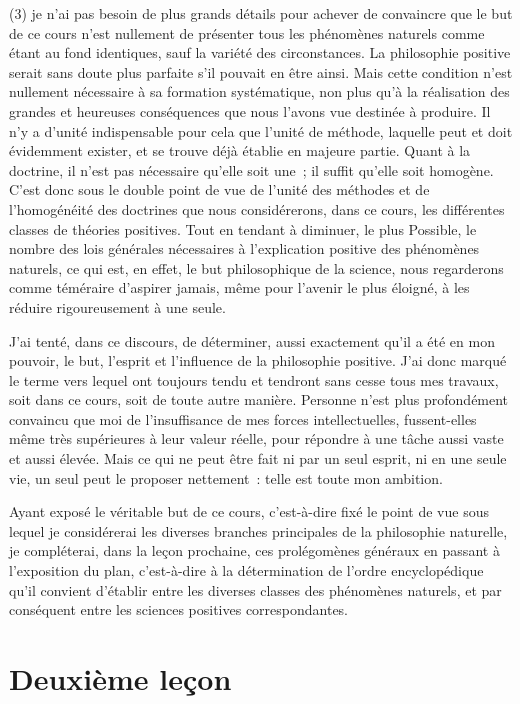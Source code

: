 \documentclass[french,twoside]{book} %
\newcommand\chapteropen{} %
\newcommand\chapterclose{} %
\begin{document}
(3) je n’ai pas besoin de plus grands détails pour achever de convaincre que le but de ce cours n’est nullement de présenter tous les phénomènes naturels comme étant au fond identiques, sauf la variété des circonstances. La philosophie positive serait sans doute plus parfaite s’il pouvait en être ainsi. Mais cette condition n’est nullement nécessaire à sa formation systématique, non plus qu’à la réalisation des grandes et heureuses conséquences que nous l’avons vue destinée à produire. Il n’y a d’unité indispensable pour cela que l’unité de méthode, laquelle peut et doit évidemment exister, et se trouve déjà établie en majeure partie. Quant à la doctrine, il n’est pas nécessaire qu’elle soit une ; il suffit qu’elle soit homogène. C’est donc sous le double point de vue de l’unité des méthodes et de l’homogénéité des doctrines que nous considérerons, dans ce cours, les différentes classes de théories positives. Tout en tendant à diminuer, le plus Possible, le nombre des lois générales nécessaires à l’explication positive des phénomènes naturels, ce qui est, en effet, le but philosophique de la science, nous regarderons comme téméraire d’aspirer jamais, même pour l’avenir le plus éloigné, à les réduire rigoureusement à une seule.\par
J’ai tenté, dans ce discours, de déterminer, aussi exactement qu’il a été en mon pouvoir, le but, l’esprit et l’influence de la philosophie positive. J’ai donc marqué le terme vers lequel ont toujours tendu et tendront sans cesse tous mes travaux, soit dans ce cours, soit de toute autre manière. Personne n’est plus profondément convaincu que moi de l’insuffisance de mes forces intellectuelles, fussent-elles même très supérieures à leur valeur réelle, pour répondre à une tâche aussi vaste et aussi élevée. Mais ce qui ne peut être fait ni par un seul esprit, ni en une seule vie, un seul peut le proposer nettement : telle est toute mon ambition.\par
Ayant exposé le véritable but de ce cours, c’est-à-dire fixé le point de vue sous lequel je considérerai les diverses branches principales de la philosophie naturelle, je compléterai, dans la leçon prochaine, ces prolégomènes généraux en passant à l’exposition du plan, c’est-à-dire à la détermination de l’ordre encyclopédique qu’il convient d’établir entre les diverses classes des phénomènes naturels, et par conséquent entre les sciences positives correspondantes.
\chapterclose


\chapteropen
\chapter[{Deuxième leçon}]{Deuxième leçon}
\label{leçon\_2}\renewcommand{\leftmark}{Deuxième leçon}
\end{document}
